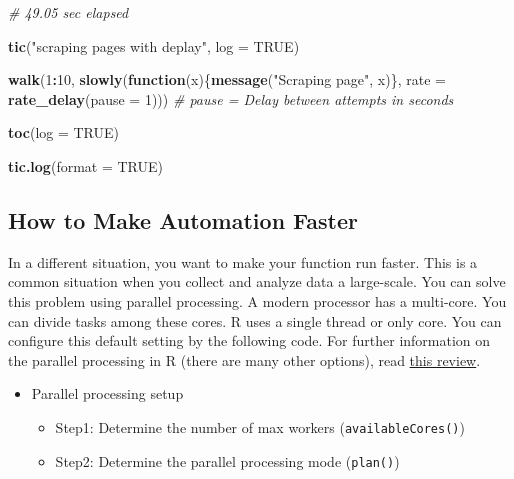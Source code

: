 \documentclass[
]{book}
\newenvironment{Shaded}{\begin{snugshade}}{\end{snugshade}}
\newcommand{\AttributeTok}[1]{\textcolor[rgb]{0.13,0.29,0.53}{#1}}
\newcommand{\CommentTok}[1]{\textcolor[rgb]{0.56,0.35,0.01}{\textit{#1}}}
\newcommand{\ConstantTok}[1]{\textcolor[rgb]{0.56,0.35,0.01}{#1}}
\newcommand{\ControlFlowTok}[1]{\textcolor[rgb]{0.13,0.29,0.53}{\textbf{#1}}}
\newcommand{\DecValTok}[1]{\textcolor[rgb]{0.00,0.00,0.81}{#1}}
\newcommand{\FunctionTok}[1]{\textcolor[rgb]{0.13,0.29,0.53}{\textbf{#1}}}
\newcommand{\NormalTok}[1]{#1}
\newcommand{\SpecialCharTok}[1]{\textcolor[rgb]{0.81,0.36,0.00}{\textbf{#1}}}
\newcommand{\StringTok}[1]{\textcolor[rgb]{0.31,0.60,0.02}{#1}}
\begin{document}
\begin{Shaded}
\begin{Highlighting}[]
\CommentTok{\# 49.05 sec elapsed}

\FunctionTok{tic}\NormalTok{(}\StringTok{"scraping pages with deplay"}\NormalTok{, }\AttributeTok{log =} \ConstantTok{TRUE}\NormalTok{)}

\FunctionTok{walk}\NormalTok{(}\DecValTok{1}\SpecialCharTok{:}\DecValTok{10}\NormalTok{, }\FunctionTok{slowly}\NormalTok{(}\ControlFlowTok{function}\NormalTok{(x)\{}\FunctionTok{message}\NormalTok{(}\StringTok{"Scraping page"}\NormalTok{, x)\},   }
                    \AttributeTok{rate =} \FunctionTok{rate\_delay}\NormalTok{(}\AttributeTok{pause =} \DecValTok{1}\NormalTok{))) }\CommentTok{\# pause = Delay between attempts in seconds}

\FunctionTok{toc}\NormalTok{(}\AttributeTok{log =} \ConstantTok{TRUE}\NormalTok{)}

\FunctionTok{tic.log}\NormalTok{(}\AttributeTok{format =} \ConstantTok{TRUE}\NormalTok{)}
\end{Highlighting}
\end{Shaded}

\subsection{How to Make Automation Faster}\label{how-to-make-automation-faster}

In a different situation, you want to make your function run faster. This is a common situation when you collect and analyze data a large-scale. You can solve this problem using parallel processing. A modern processor has a multi-core. You can divide tasks among these cores. R uses a single thread or only core. You can configure this default setting by the following code. For further information on the parallel processing in R (there are many other options), read \href{https://yxue-me.com/post/2019-05-12-a-glossary-of-parallel-computing-packages-in-r-2019/}{this review}.

\begin{itemize}
\item
  Parallel processing setup

  \begin{itemize}
  \item
    Step1: Determine the number of max workers (\texttt{availableCores()})
  \item
    Step2: Determine the parallel processing mode (\texttt{plan()})
  \end{itemize}
\end{itemize}
\end{document}
